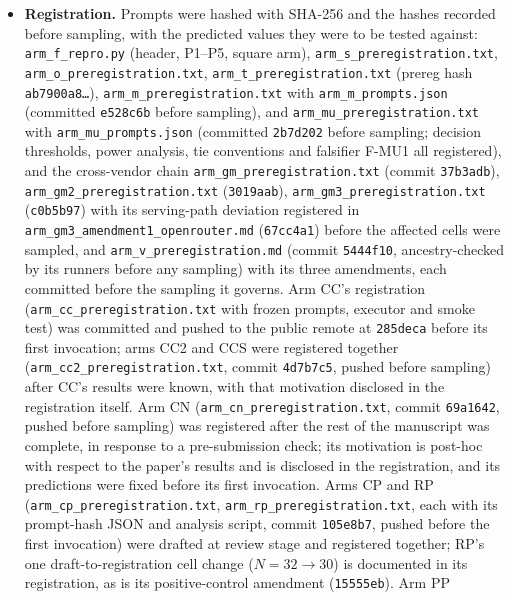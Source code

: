 \begin{itemize}
\item \textbf{Registration.} Prompts were hashed with SHA-256 and the hashes recorded before sampling,
  with the predicted values they were to be tested against: \texttt{arm\_f\_repro.py} (header, P1--P5,
  square arm), \texttt{arm\_s\_preregistration.txt}, \texttt{arm\_o\_preregistration.txt},
  \texttt{arm\_t\_preregistration.txt} (prereg hash \texttt{ab7900a8\ldots}), \texttt{arm\_m\_preregistration.txt} with
  \texttt{arm\_m\_prompts.json} (committed \texttt{e528c6b} before sampling), and
  \texttt{arm\_mu\_preregistration.txt} with \texttt{arm\_mu\_prompts.json} (committed \texttt{2b7d202} before
  sampling; decision thresholds, power analysis, tie conventions and falsifier F-MU1 all
  registered), and the cross-vendor chain \texttt{arm\_gm\_preregistration.txt} (commit \texttt{37b3adb}),
  \texttt{arm\_gm2\_preregistration.txt} (\texttt{3019aab}), \texttt{arm\_gm3\_preregistration.txt} (\texttt{c0b5b97}) with
  its serving-path deviation registered in \texttt{arm\_gm3\_amendment1\_openrouter.md} (\texttt{67cc4a1})
  before the affected cells were sampled, and \texttt{arm\_v\_preregistration.md} (commit \texttt{5444f10},
  ancestry-checked by its runners before any sampling) with its three amendments, each
  committed before the sampling it governs. Arm CC's registration
  (\texttt{arm\_cc\_preregistration.txt} with frozen prompts, executor and smoke test) was
  committed and pushed to the public remote at \texttt{285deca} before its first invocation;
  arms CC2 and CCS were registered together (\texttt{arm\_cc2\_preregistration.txt}, commit
  \texttt{4d7b7c5}, pushed before sampling) after CC's results were known, with that
  motivation disclosed in the registration itself. Arm CN (\texttt{arm\_cn\_preregistration.txt},
  commit \texttt{69a1642}, pushed before sampling) was registered after the rest of the manuscript was
  complete, in response to a pre-submission check; its motivation is post-hoc with respect to the paper's results and is
  disclosed in the registration, and its predictions were fixed before its first invocation.
  Arms CP and RP (\texttt{arm\_cp\_preregistration.txt}, \texttt{arm\_rp\_preregistration.txt},
  each with its prompt-hash JSON and analysis script, commit \texttt{105e8b7}, pushed before
  the first invocation) were drafted at review stage and registered together; RP's one
  draft-to-registration cell change ($N = 32 \rightarrow 30$) is documented in its registration,
  as is its positive-control amendment (\texttt{15555eb}). Arm PP

\end{itemize}
